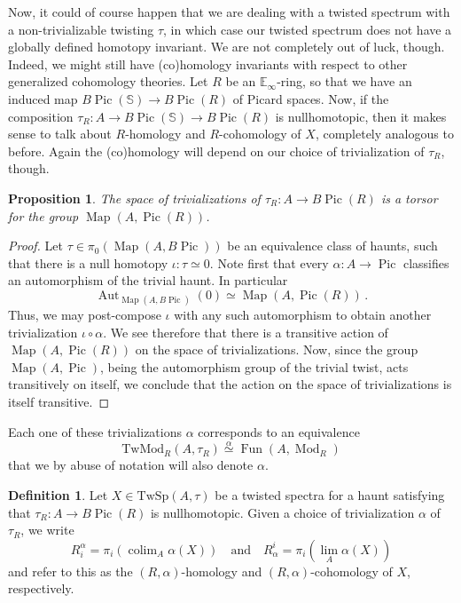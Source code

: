 \documentclass[10pt]{amsart}
\theoremstyle{plain}
\newtheorem{proposition}[theorem]{Proposition}
\theoremstyle{definition}
\newtheorem{definition}[theorem]{Definition}
\DeclareMathOperator*{\colim}{colim}
\DeclareMathOperator{\Aut}{Aut}
\DeclareMathOperator{\Mod}{Mod}
\DeclareMathOperator{\Fun}{Fun}
\DeclareMathOperator{\Pic}{Pic}
\DeclareMathOperator{\Map}{Map}
\newcommand{\bE}{\mathbb{E}}
\newcommand{\bS}{\mathbb{S}}
\newcommand{\TwSp}{\mathrm{TwSp}}
\newcommand{\och}{\quad \text{and} \quad}
\begin{document}
Now, it could of course happen that we are dealing with a twisted spectrum with a non-trivializable twisting $\tau$, in which case our twisted spectrum does not have a globally defined homotopy invariant.
We are not completely out of luck, though.
Indeed, we might still have (co)homology invariants with respect to other generalized cohomology theories.
Let $R$ be an $\bE_\infty$-ring, so that we have an induced map $B\Pic(\bS) \to B\Pic(R)$ of Picard spaces.
Now, if the composition $\tau_R : A \to B\Pic(\bS) \to B\Pic(R)$ is nullhomotopic, then it makes sense to talk about $R$-homology and  $R$-cohomology of $X$, completely analogous to before.
Again the (co)homology will depend on our choice of trivialization of $\tau_R$, though.

\begin{proposition}
  The space of trivializations of $\tau_R : A \to B\Pic(R)$ is a torsor for the group $\Map(A, \Pic(R))$.
\end{proposition}

\begin{proof}
    Let $\tau \in  \pi_0( \Map(A, B \Pic))$ be an equivalence class of haunts, such that there is a null homotopy $\iota: \tau \simeq 0$.
    Note first that every $\alpha: A \to \Pic$ classifies an automorphism of the trivial haunt.
    In particular
    \[\Aut_{\Map(A, B \Pic)}(0) \simeq \Map(A, \Pic(R)) \,.
    \]
    Thus, we may post-compose $\iota$ with any such automorphism to obtain another trivialization $\iota \circ \alpha$.
    We see therefore  that there is a transitive action of $\Map(A, \Pic(R))$ on the space of trivializations.
    Now, since the group $\Map(A, \Pic)$, being the automorphism group of the trivial twist, acts  transitively on itself, we conclude that the action on the space of trivializations is itself transitive.
\end{proof}
\noindent Each one of these trivializations $\alpha$ corresponds to an equivalence
\[
\mathrm{TwMod}_R(A,\tau_R) \overset{\alpha}\simeq \Fun(A,\Mod_R)
\]
that we by abuse of notation will also denote $\alpha$.

\begin{definition}
  Let $X \in \TwSp(A,\tau)$ be a twisted spectra for a haunt satisfying that $\tau_R : A \to B\Pic(R)$ is nullhomotopic.
  Given a choice of trivialization $\alpha$ of $\tau_R$, we write
  \[
  R^{\alpha}_i = \pi_i\left(\colim_A \alpha(X) \right) \och R^{i}_{\alpha} = \pi_i \left(\lim_A \alpha(X) \right)
  \]
  and refer to this as the $(R,\alpha)$-homology and $(R,\alpha)$-cohomology of $X$, respectively.
\end{definition}
\end{document}
